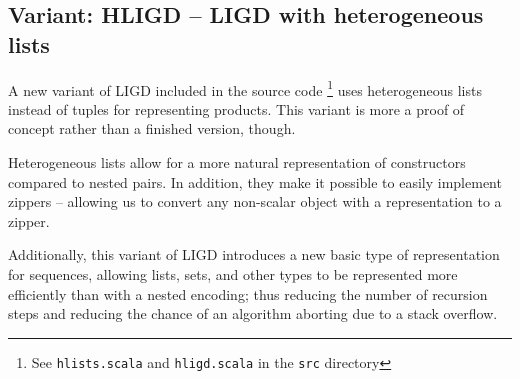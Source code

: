 \subsection{Variant: HLIGD -- LIGD with heterogeneous lists}
A new variant of LIGD included in the source code \footnote{See \texttt{hlists.scala} and \texttt{hligd.scala} in the \texttt{src} directory\cite{src}}
uses heterogeneous lists instead of tuples for representing products.
This variant is more a proof of concept rather than a finished version, though.

Heterogeneous lists allow for a more natural representation of constructors
compared to nested pairs. In addition, they make it possible to easily implement
zippers -- allowing us to convert any non-scalar object with a representation
to a zipper.

Additionally, this variant of LIGD introduces a new basic type of representation
for sequences, allowing lists, sets, and other types to be represented more
efficiently than with a nested encoding; thus reducing the number of recursion
steps and reducing the chance of an algorithm aborting due to a stack overflow.
